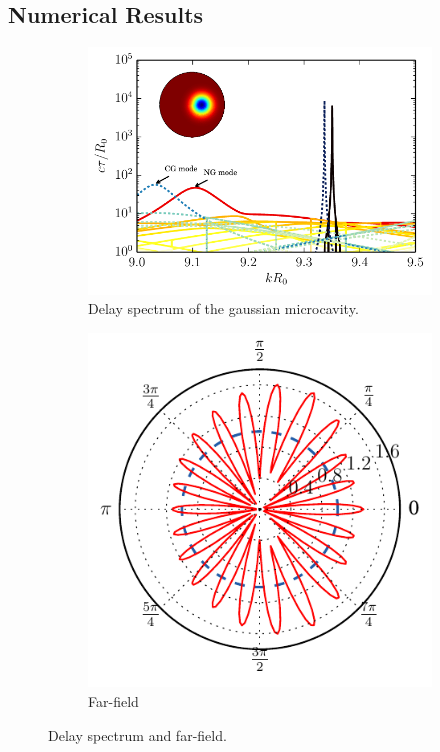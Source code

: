 \subsection{Numerical Results}
\begin{figure}
 \centering
 \begin{subfigure}[t]{0.6\textwidth}
  \centering
  \includegraphics[width=\textwidth]{figs/passive/spectrum_gaussian_inset.pdf}
  \caption{Delay spectrum of the gaussian microcavity.}
 \end{subfigure}
 \begin{subfigure}[t]{0.39\textwidth}
  \centering
  \includegraphics[width=\textwidth]{figs/passive/farField_gaussian.pdf}
  \caption{Far-field}
 \end{subfigure}
 \caption{Delay spectrum and far-field.}
\end{figure}

